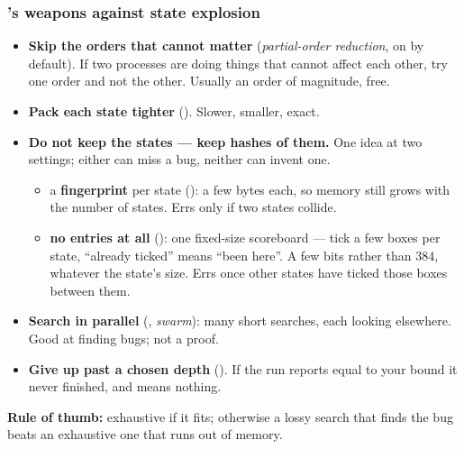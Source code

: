 \begin{frame}
  \frametitle{\spin{}'s weapons against state explosion} \small

\begin{itemize}
\item {\bf Skip the orders that cannot matter} ({\em partial-order reduction}, on
      by default). If two processes are doing things that cannot affect each
      other, try one order and not the other. Usually an order of magnitude, free.
\item {\bf Pack each state tighter} (). Slower, smaller, exact.
\item {\bf Do not keep the states --- keep hashes of them.} One idea at two
      settings; either can miss a bug, neither can invent one.
  \begin{itemize}\small
  \item a {\bf fingerprint} per state (): a few bytes each, so memory
        still grows with the number of states. Errs only if two states collide.
  \item {\bf no entries at all} (): one fixed-size scoreboard ---
        tick a few boxes per state, ``already ticked'' means ``been here''. A few
        bits rather than 384, whatever the state's size. Errs once other states
        have ticked those boxes between them.
  \end{itemize}
\item {\bf Search in parallel} (, {\em swarm}): many short searches,
      each looking elsewhere. Good at finding bugs; not a proof.
\item {\bf Give up past a chosen depth} (). If the run reports
       equal to your bound it never finished, and
       means nothing.
\end{itemize}

\pause

{\bf Rule of thumb:} exhaustive if it fits; otherwise a lossy search that finds the
bug beats an exhaustive one that runs out of memory.

\end{frame}
